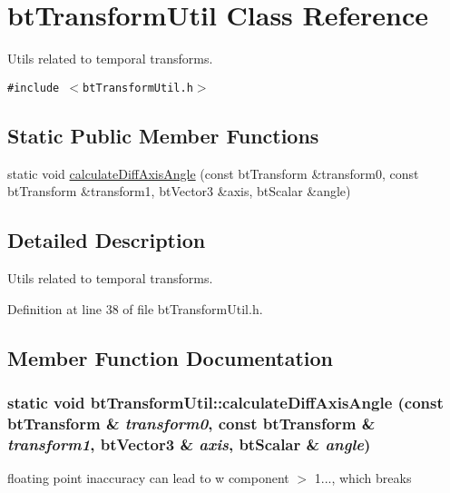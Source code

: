 \hypertarget{classbt_transform_util}{
\section{btTransformUtil Class Reference}
\label{classbt_transform_util}
}
Utils related to temporal transforms.  


{\tt \#include $<$btTransformUtil.h$>$}

\subsection*{Static Public Member Functions}
\begin{CompactItemize}
\item 
static void \hyperlink{classbt_transform_util_39f53b05940a57082053067bd5e337ec}{calculateDiffAxisAngle} (const btTransform \&transform0, const btTransform \&transform1, btVector3 \&axis, btScalar \&angle)
\end{CompactItemize}


\subsection{Detailed Description}
Utils related to temporal transforms. 

Definition at line 38 of file btTransformUtil.h.

\subsection{Member Function Documentation}
\hypertarget{classbt_transform_util_39f53b05940a57082053067bd5e337ec}{
\subsubsection[calculateDiffAxisAngle]{\setlength{\rightskip}{0pt plus 5cm}static void btTransformUtil::calculateDiffAxisAngle (const btTransform \& {\em transform0}, \/  const btTransform \& {\em transform1}, \/  btVector3 \& {\em axis}, \/  btScalar \& {\em angle})}}
\label{classbt_transform_util_39f53b05940a57082053067bd5e337ec}




floating point inaccuracy can lead to w component $>$ 1..., which breaks 

